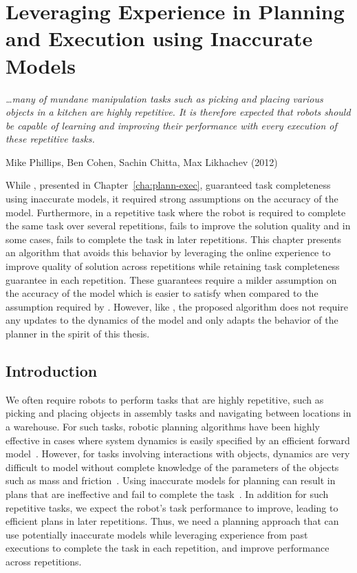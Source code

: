 \chapter{Leveraging Experience in Planning and Execution
  using Inaccurate Models}
\label{cha:lever-exper}

\epigraph{\textit{\ldots many of mundane manipulation tasks
such as picking and placing various objects in a kitchen are
highly repetitive. It is therefore expected that robots should
be capable of learning and improving their performance with
every execution of these repetitive tasks.}}{Mike Phillips, Ben Cohen,
Sachin Chitta, Max Likhachev (2012)}

While \cmax{}, presented in Chapter~\ref{cha:plann-exec}, guaranteed
task completeness using inaccurate models, it required strong
assumptions on the accuracy of the model. Furthermore, in a repetitive
task where the robot is required to complete the same task over
several repetitions, \cmax{} fails to improve the solution quality and
in some cases, fails to complete the task in later repetitions. This
chapter presents an algorithm that avoids this behavior by leveraging
the online experience to improve quality of solution across
repetitions while retaining task completeness guarantee in each
repetition. These guarantees require a milder assumption on the
accuracy of the model which is easier to satisfy when compared to the
assumption required by \cmax{}. However, like \cmax{}, the proposed
algorithm does not require any updates to the dynamics of the model
and only adapts the behavior of the planner in the spirit of this thesis.

\section{Introduction}
\label{sec:introduction}

We often require robots to perform tasks that are highly repetitive,
such as picking and placing objects in assembly tasks and navigating
between locations in a warehouse. For such tasks,
robotic planning algorithms have been highly effective in cases where
system dynamics is easily specified by an efficient forward
model~\cite{DBLP:conf/icra/BerensonAG12}. However, for
tasks involving interactions with objects, dynamics are very
difficult to model without
complete knowledge of the parameters of the
objects such as mass and friction~\cite{DBLP:journals/ijrr/JiX01}. 
Using
inaccurate models for planning can result in plans
that are ineffective and fail to complete the
task~\cite{DBLP:journals/ral/McConachiePMB20}. 
In addition for such
repetitive tasks, we expect the robot's task performance to
improve, leading to efficient plans in later repetitions.
Thus, we need
a planning approach that can use potentially inaccurate models while leveraging
experience from
past executions to complete the task in each repetition, and improve
performance across repetitions.


